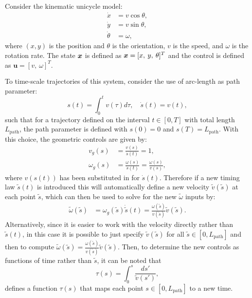 \begin{example} \label{ex:timescaleuni}
\theoremstyle{definition}
Consider the kinematic unicycle model:
\begin{equation} \label{eq:unicycle}
\begin{split}
    \dot{x} &= v\cos\theta,\\
    \dot{y} &= v\sin\theta,\\
    \dot{\theta} &= \omega, 
\end{split}
\end{equation}
where $(x, y)$ is the position and $\theta$ is the orientation, $v$ is the speed, and $\omega$ is the rotation rate. The state $\bm{x}$ is defined as $\bm{x} = [x, \: y, \: \theta]^T$ and the control is defined as $\bm{u} = [v, \:\omega]^T$.

To time-scale trajectories of this system, consider the use of arc-length as path parameter:
\begin{equation*}
    s(t) = \int_0^t v(\tau) d\tau, \quad \dot{s}(t) = v(t),
\end{equation*}
such that for a trajectory defined on the interval $t \in [0,T]$ with total length $L_{\text{path}}$, the path parameter is defined with $s(0) = 0$ and $s(T) = L_{\text{path}}$.
With this choice, the geometric controls are given by:
\begin{equation*}
\begin{split}
v_g(s) &= \frac{v(s)}{\dot{s}(t)} = 1, \\
\omega_g(s) &= \frac{\omega(s)}{\dot{s}(t)} = \frac{\omega(s)}{v(s)},
\end{split}
\end{equation*}
where $v(s(t))$ has been substituted in for $\dot{s}(t)$.
Therefore if a new timing law $\tilde{s}(t)$ is introduced this will automatically define a new velocity $\tilde{v}(\tilde{s})$ at each point $\tilde{s}$, which can then be used to solve for the new $\tilde{\omega}$ inputs by:
\begin{equation*}
\begin{split}
\tilde{\omega}(\tilde{s}) &= \omega_g(\tilde{s}) \dot{\tilde{s}}(t) = \frac{\omega(\tilde{s})}{v(\tilde{s})} \tilde{v}(\tilde{s}).
\end{split}
\end{equation*}
Alternatively, since it is easier to work with the velocity directly rather than $\tilde{s}(t)$, in this case it is possible to just specify $\tilde{v}(\tilde{s})$ for all $\tilde{s} \in [0, L_{\text{path}}]$ and then to compute $\tilde{\omega}(\tilde{s}) = \frac{\omega(\tilde{s})}{v(\tilde{s})} \tilde{v}(\tilde{s})$. Then, to determine the new controls as functions of time rather than $\tilde{s}$, it can be noted that
\begin{equation*}
    \tau(s) = \int_0^s \frac{ds'}{\tilde{v}(s')},
\end{equation*}
defines a function $\tau(s)$ that maps each point $s \in [0, L_{\text{path}}]$ to a new time.
\end{example}


